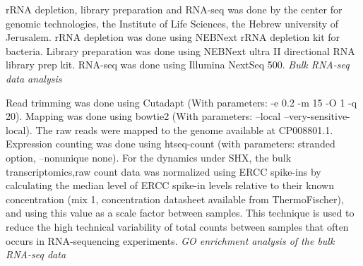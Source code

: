 \documentclass[12pt]{article}
\begin{document}
rRNA depletion, library preparation and RNA-seq was done by the center for genomic technologies, the Institute of Life Sciences, the Hebrew university of Jerusalem. rRNA depletion was done using NEBNext rRNA depletion kit for bacteria. Library preparation was done using NEBNext ultra II directional RNA library prep kit. RNA-seq was done using Illumina NextSeq 500.
\vspace{0.5cm}
\newline
\textit{Bulk RNA-seq data analysis}
\par
Read trimming was done using Cutadapt \cite{EJ200} (With parameters: -e 0.2 -m 15 -O 1 -q 20). Mapping was done using bowtie2 \cite{Langmead2012} (With parameters: --local --very-sensitive-local). The raw reads were mapped to the genome available at CP008801.1. Expression counting was done using htseq-count \cite{Anders2014} (with parameters: stranded option, --nonunique none). For the dynamics under SHX, the bulk transcriptomics,raw count data was normalized using ERCC spike-ins \cite{Jiang2011-gz} by calculating the median level of ERCC spike-in levels relative to their known concentration (mix 1, concentration datasheet available from ThermoFischer), and using this value as a scale factor between samples. This technique is used to reduce the high technical variability of total counts between samples that often occurs in RNA-sequencing experiments.
\vspace{0.5cm}
\newline
\textit{GO enrichment analysis of the bulk RNA-seq data}
\par
\end{document}
